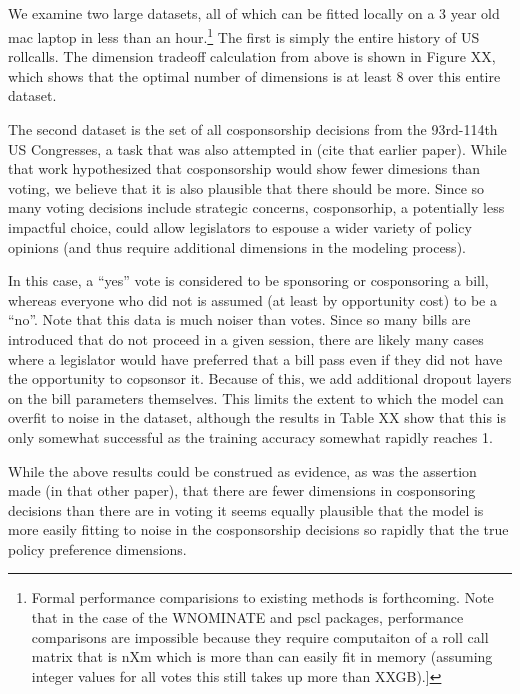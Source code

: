 \documentclass[11pt,]{article}
\begin{document}
\subsection{}\label{section}

We examine two large datasets, all of which can be fitted locally on a 3
year old mac laptop in less than an hour.\footnote{Formal performance
  comparisions to existing methods is forthcoming. Note that in the case
  of the WNOMINATE and pscl packages, performance comparisons are
  impossible because they require computaiton of a roll call matrix that
  is nXm which is more than can easily fit in memory (assuming integer
  values for all votes this still takes up more than XXGB).{]}} The
first is simply the entire history of US rollcalls. The dimension
tradeoff calculation from above is shown in Figure XX, which shows that
the optimal number of dimensions is at least 8 over this entire dataset.

The second dataset is the set of all cosponsorship decisions from the
93rd-114th US Congresses, a task that was also attempted in (cite that
earlier paper). While that work hypothesized that cosponsorship would
show fewer dimesions than voting, we believe that it is also plausible
that there should be more. Since so many voting decisions include
strategic concerns, cosponsorhip, a potentially less impactful choice,
could allow legislators to espouse a wider variety of policy opinions
(and thus require additional dimensions in the modeling process).

In this case, a ``yes'' vote is considered to be sponsoring or
cosponsoring a bill, whereas everyone who did not is assumed (at least
by opportunity cost) to be a ``no''. Note that this data is much noiser
than votes. Since so many bills are introduced that do not proceed in a
given session, there are likely many cases where a legislator would have
preferred that a bill pass even if they did not have the opportunity to
copsonsor it. Because of this, we add additional dropout layers on the
bill parameters themselves. This limits the extent to which the model
can overfit to noise in the dataset, although the results in Table XX
show that this is only somewhat successful as the training accuracy
somewhat rapidly reaches 1.

While the above results could be construed as evidence, as was the
assertion made (in that other paper), that there are fewer dimensions in
cosponsoring decisions than there are in voting it seems equally
plausible that the model is more easily fitting to noise in the
cosponsorship decisions so rapidly that the true policy preference
dimensions.
\end{document}
